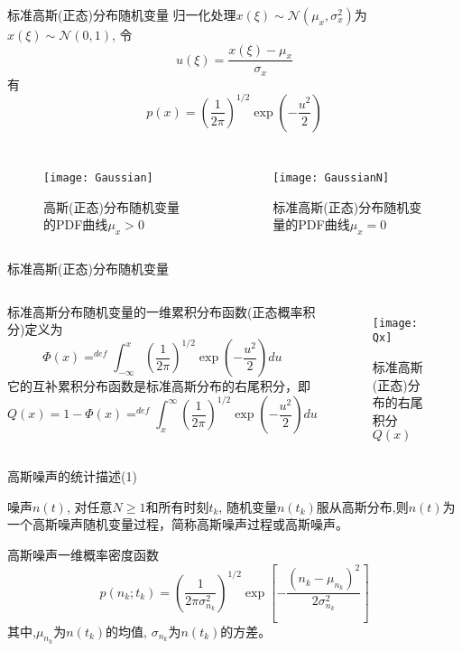 \begin{frame}{标准高斯(正态)分布随机变量}
归一化处理$x(\xi)\sim\mathcal{N}(\mu_x,\sigma_x^2)$为$x(\xi)\sim\mathcal{N}(0,1)$, 令
\[u(\xi)=\frac{x(\xi)-\mu_x}{\sigma_x}\]
有
\[p(x)=\left(\frac{1}{2\pi}\right)^{1/2}\exp\left(-\frac{u^2}{2}\right) \]
\begin{columns}
\begin{figure}[!h]
	\centering
	\texttt{[image: Gaussian]}
	\caption{高斯(正态)分布随机变量的PDF曲线$\mu_x>0$}
\end{figure}
\begin{figure}[!h]
	\centering
	\texttt{[image: GaussianN]}
	\caption{标准高斯(正态)分布随机变量的PDF曲线$\mu_x=0$}
\end{figure}
\end{columns}
\end{frame}

\begin{frame}{标准高斯(正态)分布随机变量}
\begin{columns}
标准高斯分布随机变量的一维累积分布函数(正态概率积分)定义为
\[\Phi(x)\mathop{=}^{def}\int_{-\infty}^{x}\left(\frac{1}{2\pi}\right)^{1/2}\exp\left(-\frac{u^2}{2}\right)du \]
它的互补累积分布函数是标准高斯分布的右尾积分，即
\[Q(x)=1-\Phi(x)\mathop{=}^{def}\int_{x}^{\infty}\left(\frac{1}{2\pi}\right)^{1/2}\exp\left(-\frac{u^2}{2}\right)du \]
\begin{figure}[!h]
\centering
\texttt{[image: Qx]}\\
\caption{标准高斯(正态)分布的右尾积分$Q(x)$}
\end{figure}
\end{columns}
\end{frame}

\begin{frame}{高斯噪声的统计描述(1)}
\begin{definition}[高斯噪声]
	噪声$n(t)$, 对任意$N\ge 1$和所有时刻$t_k$, 随机变量$n(t_k)$服从高斯分布,则$n(t)$为一个高斯噪声随机变量过程，简称高斯噪声过程或高斯噪声。
\end{definition}
\begin{block}{高斯噪声一维概率密度函数}
	\[p(n_k;t_k)=(\frac{1}{2\pi\sigma_{n_k}^2})^{1/2}\exp\left[-\frac{(n_k-\mu_{n_k})^2}{2\sigma_{n_k}^2}\right] \]
	其中,$\mu_{n_k}$为$n(t_k)$的均值, $\sigma_{n_k}$为$n(t_k)$的方差。
\end{block}
\end{frame}

